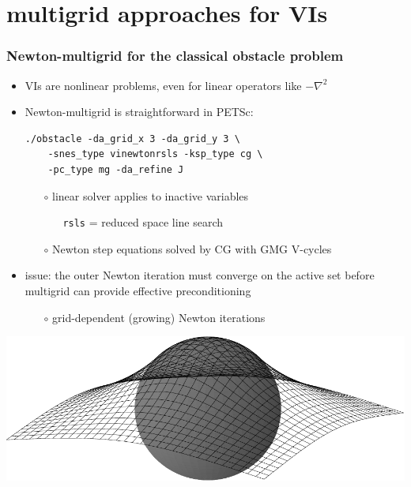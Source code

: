 \documentclass[svgnames,
               hyperref={colorlinks,citecolor=DeepPink4,linkcolor=FireBrick,urlcolor=Maroon},
               usepdftitle=false]  %
               {beamer}
\begin{document}
\section{multigrid approaches for VIs}

\begin{frame}[fragile]
\frametitle{Newton-multigrid for the classical obstacle problem}

\begin{itemize}
\item VIs are nonlinear problems, even for linear operators like $-\nabla^2$
\item Newton-multigrid is straightforward in PETSc:
\begin{Verbatim}[xleftmargin=13mm,fontsize=\scriptsize]
./obstacle -da_grid_x 3 -da_grid_y 3 \
    -snes_type vinewtonrsls -ksp_type cg \
    -pc_type mg -da_refine J
\end{Verbatim}
    \begin{itemize}
    \item[$\circ$] linear solver applies to inactive variables
        \begin{itemize}
        \item[] \texttt{rsls} = reduced space line search
        \end{itemize}
    \item[$\circ$] Newton step equations solved by CG with GMG V-cycles
    \end{itemize}
\item issue: the outer Newton iteration must converge on the active set \alert{before} multigrid can provide effective preconditioning
    \begin{itemize}
    \item[$\circ$] grid-dependent (growing) Newton iterations
    \end{itemize}
\end{itemize}

\medskip
\hspace{10mm} \includegraphics[height=0.2\textheight]{images/obstacle65.pdf}


\end{frame}
\end{document}
